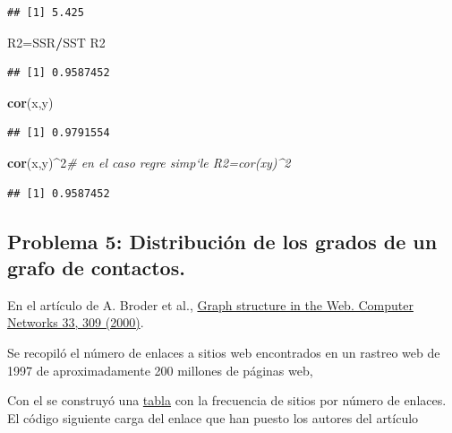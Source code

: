 \documentclass[
]{article}
\newenvironment{Shaded}{\begin{snugshade}}{\end{snugshade}}
\newcommand{\CommentTok}[1]{\textcolor[rgb]{0.56,0.35,0.01}{\textit{#1}}}
\newcommand{\DecValTok}[1]{\textcolor[rgb]{0.00,0.00,0.81}{#1}}
\newcommand{\KeywordTok}[1]{\textcolor[rgb]{0.13,0.29,0.53}{\textbf{#1}}}
\newcommand{\NormalTok}[1]{#1}
\newcommand{\OperatorTok}[1]{\textcolor[rgb]{0.81,0.36,0.00}{\textbf{#1}}}
\begin{document}
\begin{verbatim}
## [1] 5.425
\end{verbatim}

\begin{Shaded}
\begin{Highlighting}[]
\NormalTok{R2=SSR}\OperatorTok{/}\NormalTok{SST}
\NormalTok{R2}
\end{Highlighting}
\end{Shaded}

\begin{verbatim}
## [1] 0.9587452
\end{verbatim}

\begin{Shaded}
\begin{Highlighting}[]
\KeywordTok{cor}\NormalTok{(x,y)}
\end{Highlighting}
\end{Shaded}

\begin{verbatim}
## [1] 0.9791554
\end{verbatim}

\begin{Shaded}
\begin{Highlighting}[]
\KeywordTok{cor}\NormalTok{(x,y)}\OperatorTok{^}\DecValTok{2}\CommentTok{# en el caso regre simp`le R2=cor(xy)^2}
\end{Highlighting}
\end{Shaded}

\begin{verbatim}
## [1] 0.9587452
\end{verbatim}

\hypertarget{problema-5-distribuciuxf3n-de-los-grados-de-un-grafo-de-contactos.}{%
\subsection{Problema 5: Distribución de los grados de un grafo de
contactos.}\label{problema-5-distribuciuxf3n-de-los-grados-de-un-grafo-de-contactos.}}

En el artículo de A. Broder et al.,
\href{http://snap.stanford.edu/class/cs224w-readings/broder00bowtie.pdf}{Graph
structure in the Web. Computer Networks 33, 309 (2000)}.

Se recopiló el número de enlaces a sitios web encontrados en un rastreo
web de 1997 de aproximadamente 200 millones de páginas web,

Con el se construyó una
\href{http://tuvalu.santafe.edu/~aaronc/powerlaws/data/weblinks.hist}{tabla}
con la frecuencia de sitios por número de enlaces. El código siguiente
carga del enlace que han puesto los autores del artículo
\end{document}
